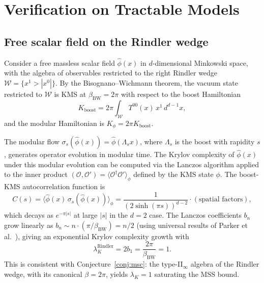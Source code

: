 \documentclass[12pt,a4paper]{article}
\begin{document}
\section{Verification on Tractable Models}
\label{sec:models}

\subsection{Free scalar field on the Rindler wedge}

Consider a free massless scalar field $\hat\phi(x)$ in $d$-dimensional
Minkowski space, with the algebra of observables restricted to the
right Rindler wedge $\mathcal{W} = \{x^1 > |x^0|\}$.
By the Bisognano--Wichmann theorem, the vacuum state restricted to
$\mathcal{W}$ is KMS at $\beta_{\mathrm{BW}} = 2\pi$ with respect to
the boost Hamiltonian
\begin{equation}
  K_{\mathrm{boost}} = 2\pi \int_{\mathcal{W}} T^{00}(x)\, x^1\, d^{d-1}x,
\end{equation}
and the modular Hamiltonian is $K_\phi = 2\pi K_{\mathrm{boost}}$.

The modular flow $\sigma_s(\hat\phi(x)) = \hat\phi(\Lambda_s x)$,
where $\Lambda_s$ is the boost with rapidity $s$, generates operator
evolution in modular time.
The Krylov complexity of $\hat\phi(x)$ under this modular evolution
can be computed via the Lanczos algorithm applied to the inner product
$(\mathcal{O}, \mathcal{O}') = \langle \mathcal{O}^\dagger
\mathcal{O}'\rangle_\phi$ defined by the KMS state $\phi$.
The boost-KMS autocorrelation function is
\begin{equation}
  C(s) = \langle \hat\phi(x)\,\sigma_s(\hat\phi(x))\rangle_\phi
       = \frac{1}{(2\sinh(\pi s))^{d-2}}\cdot(\text{spatial factors}),
\end{equation}
which decays as $e^{-\pi |s|}$ at large $|s|$ in the $d=2$ case.
The Lanczos coefficients $b_n$ grow linearly as $b_n \sim n\cdot
(\pi/\beta_{\mathrm{BW}}) = n/2$ (using universal results of
Parker et al.~\cite{Parker2019}), giving an exponential Krylov
complexity growth with
\begin{equation}
  \lambda_K^{\mathrm{Rindler}} = 2b_1 = \frac{2\pi}{\beta_{\mathrm{BW}}} = 1.
  \label{eq:rindler-krylov}
\end{equation}
This is consistent with Conjecture~\ref{conj:msc}: the type-II$_\infty$
algebra of the Rindler wedge, with its canonical $\beta = 2\pi$, yields
$\lambda_K = 1$ saturating the MSS bound.
\end{document}
